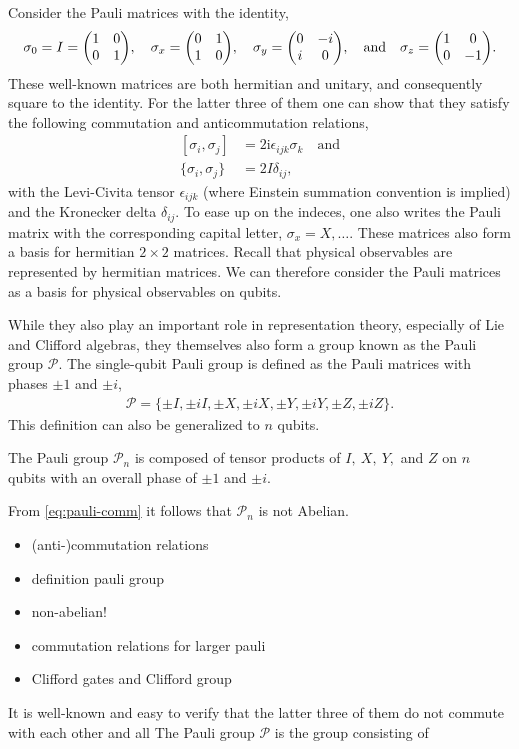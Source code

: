 Consider the Pauli matrices with the identity,
\begin{align}
  \sigma_0 = I = \mqty(\pmat{0}),\quad \sigma_x = \mqty(\pmat{1}), \quad \sigma_y =
  \mqty(\pmat{2}), \quad \text{and}\quad \sigma_z = \mqty(\pmat{3})
.\end{align}
These well-known matrices are both hermitian and unitary, and consequently
square to the identity. For the latter three of them one can show that they
satisfy the following commutation and anticommutation relations,
\begin{equation}\label{eq:pauli-comm}
 \begin{split}
  [\sigma_i, \sigma_j] &= 2\mathrm{i}\epsilon_{ijk}\sigma_k \quad \text{and} \\
  \{\sigma_i, \sigma_j\} &= 2I \delta_{ij}
,\end{split} 
\end{equation}
with the Levi-Civita tensor $\epsilon_{ijk}$ (where Einstein summation
convention is implied) and the Kronecker delta $\delta_{ij}$. To ease up on the
indeces, one also writes the Pauli matrix with the corresponding capital
letter, $\sigma_x = X, \ldots$. These matrices also form a basis for hermitian
$2\times 2$ matrices. Recall that physical observables are represented by
hermitian matrices. We can therefore consider the Pauli matrices as a basis for
physical observables on qubits. 

While they also play
an important role in representation theory, especially of Lie and Clifford
algebras, they themselves also form a group known as the Pauli group
$\mathcal{P}$. The single-qubit Pauli group is defined as the Pauli matrices
with phases $\pm 1$ and $\pm i$,
\begin{align}
  \mathcal{P} = \{\pm I, \pm i I, \pm X, \pm i X, \pm Y, \pm i Y, \pm Z, \pm i
  Z \}
.\end{align}
This definition can also be generalized to $n$ qubits.
\begin{defn}\label{defn:pauligroup}
  The Pauli group $\mathcal{P}_n$ is composed of tensor products of $I,\ X,\
  Y,$ and $Z$ on $n$ qubits with an overall phase of $\pm 1$ and $\pm i$.
\end{defn}
From \cref{eq:pauli-comm} it follows that $\mathcal{P}_n$ is not Abelian. 

\begin{itemize}
  \item (anti-)commutation relations
  \item definition pauli group
  \item non-abelian!
  \item commutation relations for larger pauli
  \item Clifford gates and Clifford group
\end{itemize}
It is well-known and easy to verify that the latter three of them do not
commute with each other and all 
The Pauli group $\mathcal{P}$ is the group consisting of 

